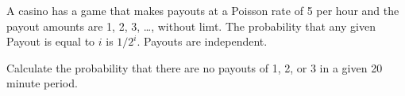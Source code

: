 A casino has a game that makes payouts at a Poisson rate of 5 per hour and the payout amounts are 1, 2, 3, \ldots, without limt. 
The probability that any given Payout is equal to $i$ is $1/2^i$. Payouts are independent. 

\medskip
Calculate the probability that there are no payouts of 1, 2, or 3 in a given 20 minute period. 




